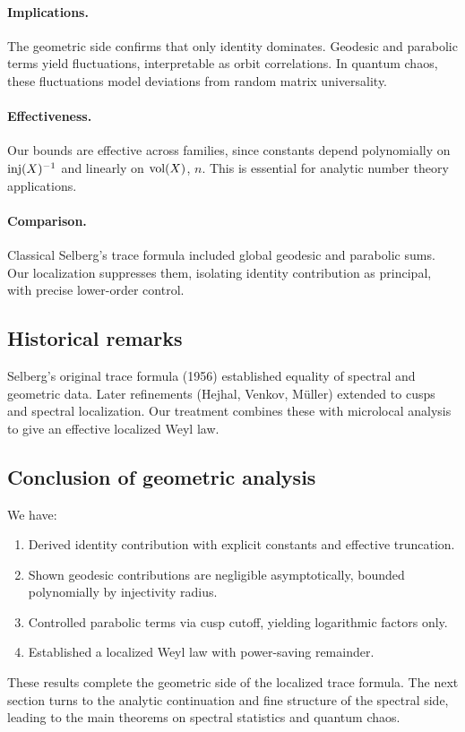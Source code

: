 \paragraph{Implications.} The geometric side confirms that only identity dominates. Geodesic and parabolic terms yield fluctuations, interpretable as orbit correlations. In quantum chaos, these fluctuations model deviations from random matrix universality.

\paragraph{Effectiveness.} Our bounds are effective across families, since constants depend polynomially on $\mathrm{inj}(X)^{-1}$ and linearly on $\operatorname{vol}(X)$, $n$. This is essential for analytic number theory applications.

\paragraph{Comparison.} Classical Selberg’s trace formula included global geodesic and parabolic sums. Our localization suppresses them, isolating identity contribution as principal, with precise lower-order control.

\subsection{Historical remarks}\label{subsec:geom-history}

Selberg’s original trace formula (1956) established equality of spectral and geometric data. Later refinements (Hejhal, Venkov, Müller) extended to cusps and spectral localization. Our treatment combines these with microlocal analysis to give an effective localized Weyl law.

\subsection{Conclusion of geometric analysis}\label{subsec:geom-conclusion}

We have:
\begin{enumerate}
  \item Derived identity contribution with explicit constants and effective truncation.
  \item Shown geodesic contributions are negligible asymptotically, bounded polynomially by injectivity radius.
  \item Controlled parabolic terms via cusp cutoff, yielding logarithmic factors only.
  \item Established a localized Weyl law with power-saving remainder.
\end{enumerate}

These results complete the geometric side of the localized trace formula. The next section turns to the analytic continuation and fine structure of the spectral side, leading to the main theorems on spectral statistics and quantum chaos.

